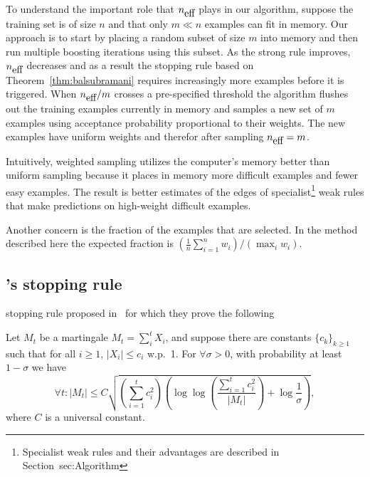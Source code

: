 To understand the important role that ${n_{\mbox{eff}}}$ plays in our algorithm,
suppose the training set is of size $n$ and that only $m \ll n$
examples can fit in memory. Our approach is to start by placing a
random subset of size $m$ into memory and then run multiple
boosting iterations using this subset. As the strong rule improves,
${n_{\mbox{eff}}}$ decreases and as a result the stopping rule based on
Theorem~\ref{thm:balsubramani} requires increasingly more examples
before it is triggered. When ${n_{\mbox{eff}}}/m$ crosses a pre-specified
threshold the algorithm flushes out the training examples currently in
memory and samples a new set of $m$ examples using acceptance
probability proportional to their weights. The new examples have
uniform weights and therefor after sampling ${n_{\mbox{eff}}}=m$.

Intuitively, weighted sampling utilizes the computer's memory better
than uniform sampling because it places in memory more difficult
examples and fewer easy examples. The result is better estimates of
the edges of specialist\footnote{Specialist weak rules and their
  advantages are described in Section~{sec:Algorithm}} weak rules that
make predictions on high-weight difficult examples.


Another concern is the fraction of the examples that are selected. In
the method described here the expected fraction is $(\frac{1}{n}
\sum_{i=1}^n w_i)/(\max_i w_i)$.

\subsection{\Sparrow's stopping rule} \label{sec:balsubramani}
 stopping rule proposed
in~\cite{balsubramani_sharp_2014} for which they prove the following

\begin{theorem} \label{thm:balsubramani}
  Let $M_t$ be a martingale $M_t = \sum_i^t X_i$,
  and suppose there are constants $\{c_k\}_{k \geq 1}$ such that
  for all $i \geq 1$, $|X_i| \leq c_i$ w.p.\ 1.
  For $\forall \sigma > 0$, with probability at least $1 - \sigma$ we have
  \[
  \forall t: |M_t| \leq C \sqrt{
    \left( \sum_{i=1}^t c_i^2 \right)
    \left( \log \log \left( \frac{ \sum_{i=1}^t c_i^2 }{ |M_t| }\right) +
    \log \frac{1}{\sigma} \right)
  },
  \]
  where $C$ is a universal constant.
\end{theorem}
